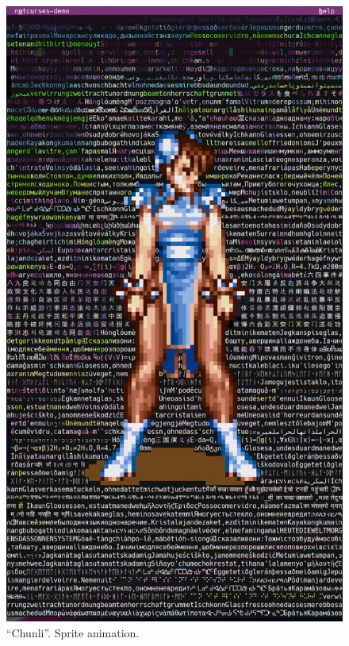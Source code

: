 \documentclass[letterpaper,10pt]{article}
\begin{document}
\begin{figure}
  \centering \includegraphics[width=.65\linewidth]{media/demo-chunli2.png}
  \caption{``Chunli''. Sprite animation.}
\end{figure}
\end{document}
